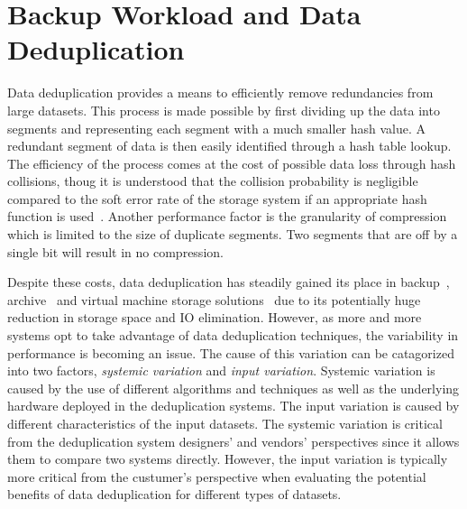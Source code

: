 \chapter{Backup Workload and Data Deduplication}
\label{dedup}

Data deduplication provides a means to efficiently remove redundancies from large datasets. 
This process is made possible by first dividing up the data into segments and representing each segment with a much smaller hash value. 
A redundant segment of data is then easily identified through a hash table lookup. 
The efficiency of the process comes at the cost of possible data loss through hash collisions, thoug it is understood that the collision probability is negligible compared to the soft error rate of the storage system if an appropriate hash function is used~\cite{aronovich:2009, zhu:2008, bobbarjung:2006, muthitacharoen:2001}. 
Another performance factor is the granularity of compression which is limited to the size of duplicate segments. 
Two segments that are off by a single bit will result in no compression.  
	
Despite these costs, data deduplication has steadily gained its place in backup~\cite{meister:2009, lillibridge:2009, zhu:2008}, archive~\cite{you:2005} and virtual machine storage solutions~\cite{smith:2008, jin:2009, clements:2009} due to its potentially huge reduction in storage space and IO elimination. 
However, as more and more systems opt to take advantage of data deduplication techniques, the variability in performance is becoming an issue. 
The cause of this variation can be catagorized into two factors, \emph{systemic variation} and \emph{input variation}. Systemic variation is caused by the use of different algorithms and techniques as well as the underlying hardware deployed in the deduplication systems. The input variation is caused by different characteristics of the input datasets. The systemic variation is critical from the deduplication system designers' and vendors' perspectives since it allows them to compare two systems directly. However, the input variation is typically more critical from the custumer's perspective when evaluating the potential benefits of data deduplication for different types of datasets.  

